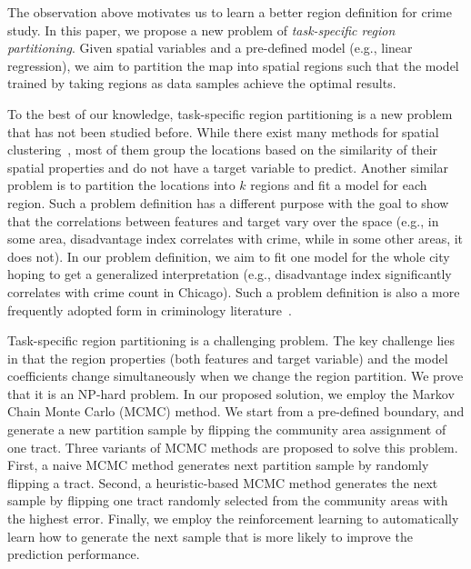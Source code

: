 The observation above motivates us to learn a better region definition for crime study. In this paper, we propose a new problem of \emph{task-specific region partitioning}. Given spatial variables and a pre-defined model (e.g., linear regression), we aim to partition the map into spatial regions such that the model trained by taking regions as data samples achieve the optimal results.

To the best of our knowledge, task-specific region partitioning is a new problem that has not been studied before. While there exist many methods for spatial clustering~\cite{miller2009geographic}, most of them group the locations based on the similarity of their spatial properties and do not have a target variable to predict. Another similar problem is to partition the locations into $k$ regions and fit a model for each region. Such a problem definition has a different purpose with the goal to show that the correlations between features and target vary over the space (e.g., in some area, disadvantage index  correlates with crime, while in some other areas, it does not). In our problem definition, we aim to fit one model for the whole city hoping to get a generalized interpretation (e.g., disadvantage index  significantly correlates with crime count in Chicago). Such a problem definition is also a more frequently adopted form in criminology literature~\cite{graif2017long}.

Task-specific region partitioning is a challenging problem. The key challenge lies in that the region properties (both features and target variable) and the model coefficients change simultaneously when we change the region partition. We prove that it is an NP-hard problem. In our proposed solution, we employ the Markov Chain Monte Carlo (MCMC) method. We start from a pre-defined boundary, and generate a new partition sample by flipping the community area assignment of one tract. Three variants of MCMC methods are proposed to solve this problem. First, a naive MCMC method generates next partition sample by randomly flipping a tract. Second, a heuristic-based MCMC method generates the next sample by flipping one tract randomly selected from the community areas with the highest error. Finally, we employ the reinforcement learning to automatically learn how to generate the next sample that is more likely to improve the prediction performance.


